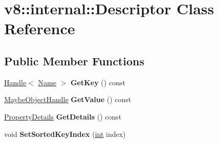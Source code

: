 \hypertarget{classv8_1_1internal_1_1Descriptor}{}\section{v8\+:\+:internal\+:\+:Descriptor Class Reference}
\label{classv8_1_1internal_1_1Descriptor}
\subsection*{Public Member Functions}
\begin{DoxyCompactItemize}
\item 
\mbox{\label{classv8_1_1internal_1_1Descriptor_ac65a5cc8585b747038f46d7dfdff50ee}} 
\mbox{\hyperlink{classv8_1_1internal_1_1Handle}{Handle}}$<$ \mbox{\hyperlink{classv8_1_1internal_1_1Name}{Name}} $>$ {\bfseries Get\+Key} () const
\item 
\mbox{\label{classv8_1_1internal_1_1Descriptor_a6bb30493c22e148e9f733f040eb13f7a}} 
\mbox{\hyperlink{classv8_1_1internal_1_1MaybeObjectHandle}{Maybe\+Object\+Handle}} {\bfseries Get\+Value} () const
\item 
\mbox{\label{classv8_1_1internal_1_1Descriptor_ae88c3a772e8467f2dfb598ac6ea038c1}} 
\mbox{\hyperlink{classv8_1_1internal_1_1PropertyDetails}{Property\+Details}} {\bfseries Get\+Details} () const
\item 
\mbox{\label{classv8_1_1internal_1_1Descriptor_afbfe947af08f693fa60987babc295aa6}} 
void {\bfseries Set\+Sorted\+Key\+Index} (\mbox{\hyperlink{classint}{int}} index)
\end{DoxyCompactItemize}
